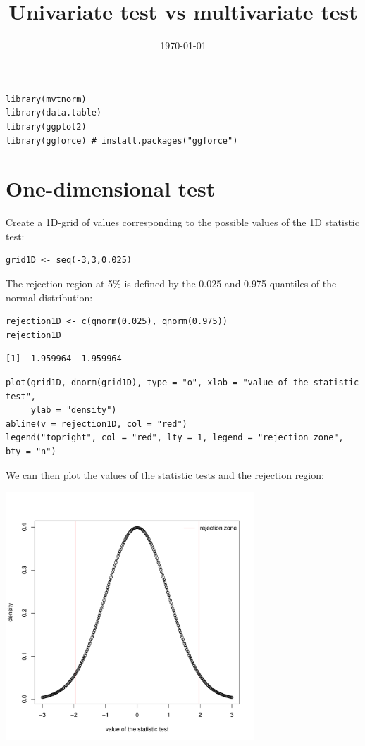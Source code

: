 \documentclass[12pt]{article}
\date{\today}
\title{Univariate test vs multivariate test}
\begin{document}
\maketitle
\lstset{language=r,label= ,caption= ,captionpos=b,numbers=none}
\begin{lstlisting}
library(mvtnorm)
library(data.table)
library(ggplot2)
library(ggforce) # install.packages("ggforce")
\end{lstlisting}

\section{One-dimensional test}
\label{sec:org64e92a8}

Create a 1D-grid of values corresponding to the possible values of the 1D statistic test:
\lstset{language=r,label= ,caption= ,captionpos=b,numbers=none}
\begin{lstlisting}
grid1D <- seq(-3,3,0.025)
\end{lstlisting}

The rejection region at 5\% is defined by the 0.025 and 0.975 quantiles of the normal distribution:
\lstset{language=r,label= ,caption= ,captionpos=b,numbers=none}
\begin{lstlisting}
rejection1D <- c(qnorm(0.025), qnorm(0.975))
rejection1D
\end{lstlisting}

\begin{verbatim}
[1] -1.959964  1.959964
\end{verbatim}

\lstset{language=r,label= ,caption= ,captionpos=b,numbers=none}
\begin{lstlisting}
plot(grid1D, dnorm(grid1D), type = "o", xlab = "value of the statistic test", 
     ylab = "density")
abline(v = rejection1D, col = "red")
legend("topright", col = "red", lty = 1, legend = "rejection zone", bty = "n")
\end{lstlisting}

We can then plot the values of the statistic tests and the rejection region:
\begin{center}
\includegraphics[width=0.7\textwidth]{figures/1D-test.pdf}
\end{center}
\end{document}
